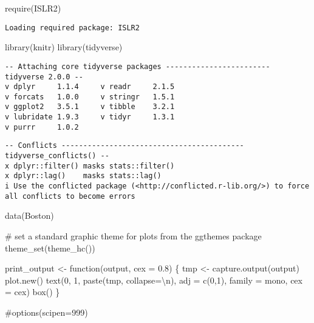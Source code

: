 \documentclass[
  letterpaper,
  DIV=11,
  numbers=noendperiod]{scrartcl}
\newenvironment{Shaded}{\begin{snugshade}}{\end{snugshade}}
\newcommand{\AttributeTok}[1]{\textcolor[rgb]{0.40,0.45,0.13}{#1}}
\newcommand{\CommentTok}[1]{\textcolor[rgb]{0.37,0.37,0.37}{#1}}
\newcommand{\ControlFlowTok}[1]{\textcolor[rgb]{0.00,0.23,0.31}{#1}}
\newcommand{\DecValTok}[1]{\textcolor[rgb]{0.68,0.00,0.00}{#1}}
\newcommand{\FloatTok}[1]{\textcolor[rgb]{0.68,0.00,0.00}{#1}}
\newcommand{\FunctionTok}[1]{\textcolor[rgb]{0.28,0.35,0.67}{#1}}
\newcommand{\NormalTok}[1]{\textcolor[rgb]{0.00,0.23,0.31}{#1}}
\newcommand{\OtherTok}[1]{\textcolor[rgb]{0.00,0.23,0.31}{#1}}
\newcommand{\SpecialCharTok}[1]{\textcolor[rgb]{0.37,0.37,0.37}{#1}}
\newcommand{\StringTok}[1]{\textcolor[rgb]{0.13,0.47,0.30}{#1}}
\begin{document}
\begin{Shaded}
\begin{Highlighting}[]
\FunctionTok{require}\NormalTok{(ISLR2)}
\end{Highlighting}
\end{Shaded}

\begin{verbatim}
Loading required package: ISLR2
\end{verbatim}

\begin{Shaded}
\begin{Highlighting}[]
\FunctionTok{library}\NormalTok{(knitr)}
\FunctionTok{library}\NormalTok{(tidyverse)}
\end{Highlighting}
\end{Shaded}

\begin{verbatim}
-- Attaching core tidyverse packages ------------------------ tidyverse 2.0.0 --
v dplyr     1.1.4     v readr     2.1.5
v forcats   1.0.0     v stringr   1.5.1
v ggplot2   3.5.1     v tibble    3.2.1
v lubridate 1.9.3     v tidyr     1.3.1
v purrr     1.0.2     
\end{verbatim}

\begin{verbatim}
-- Conflicts ------------------------------------------ tidyverse_conflicts() --
x dplyr::filter() masks stats::filter()
x dplyr::lag()    masks stats::lag()
i Use the conflicted package (<http://conflicted.r-lib.org/>) to force all conflicts to become errors
\end{verbatim}

\begin{Shaded}
\begin{Highlighting}[]
\FunctionTok{data}\NormalTok{(Boston)}

\CommentTok{\# set a standard graphic theme for plots from the ggthemes package}
\FunctionTok{theme\_set}\NormalTok{(}\FunctionTok{theme\_hc}\NormalTok{())}

\NormalTok{print\_output }\OtherTok{\textless{}{-}} \ControlFlowTok{function}\NormalTok{(output, }\AttributeTok{cex =} \FloatTok{0.8}\NormalTok{) \{}
\NormalTok{  tmp }\OtherTok{\textless{}{-}} \FunctionTok{capture.output}\NormalTok{(output)}
  \FunctionTok{plot.new}\NormalTok{()}
  \FunctionTok{text}\NormalTok{(}\DecValTok{0}\NormalTok{, }\DecValTok{1}\NormalTok{, }\FunctionTok{paste}\NormalTok{(tmp, }\AttributeTok{collapse=}\StringTok{\textquotesingle{}}\SpecialCharTok{\textbackslash{}n}\StringTok{\textquotesingle{}}\NormalTok{), }\AttributeTok{adj =} \FunctionTok{c}\NormalTok{(}\DecValTok{0}\NormalTok{,}\DecValTok{1}\NormalTok{), }\AttributeTok{family =} \StringTok{\textquotesingle{}mono\textquotesingle{}}\NormalTok{, }\AttributeTok{cex =}\NormalTok{ cex)}
  \FunctionTok{box}\NormalTok{()}
\NormalTok{\}}

\CommentTok{\#options(scipen=999)}
\end{Highlighting}
\end{Shaded}
\end{document}
